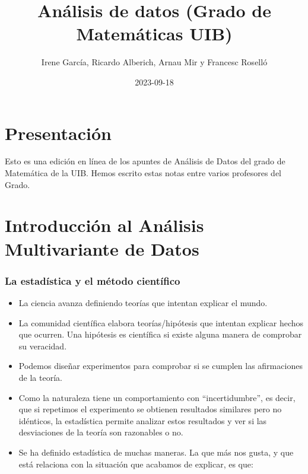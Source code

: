\documentclass[
  letterpaper,
  DIV=11,
  numbers=noendperiod]{scrreprt}
\title{Análisis de datos (Grado de Matemáticas UIB)}
\author{Irene García, Ricardo Alberich, Arnau Mir y Francesc Roselló}
\date{2023-09-18}
\renewcommand*\contentsname{Tabla de contenidos}
\newcommand\contentsname{Tabla de contenidos}
\begin{document}
\maketitle
\ifdefined\Shaded\renewenvironment{Shaded}{\begin{tcolorbox}[enhanced, boxrule=0pt, breakable, sharp corners, frame hidden, borderline west={3pt}{0pt}{shadecolor}, interior hidden]}{\end{tcolorbox}}\fi

\renewcommand*\contentsname{Tabla de contenidos}
{
\hypersetup{linkcolor=}
\setcounter{tocdepth}{2}
\tableofcontents
}

\hypertarget{presentaciuxf3n}{%
\chapter*{Presentación}\label{presentaciuxf3n}}


Esto es una edición en línea de los apuntes de Análisis de Datos del
grado de Matemática de la UIB. Hemos escrito estas notas entre varios
profesores del Grado.


\hypertarget{introducciuxf3n-al-anuxe1lisis-multivariante-de-datos}{%
\chapter{Introducción al Análisis Multivariante de
Datos}\label{introducciuxf3n-al-anuxe1lisis-multivariante-de-datos}}

\hypertarget{la-estaduxedstica-y-el-muxe9todo-cientuxedfico}{%
\subsection{La estadística y el método
científico}\label{la-estaduxedstica-y-el-muxe9todo-cientuxedfico}}

\begin{itemize}
\item
  La ciencia avanza definiendo teorías que intentan explicar el mundo.
\item
  La comunidad científica elabora teorías/hipótesis que intentan
  explicar hechos que ocurren. Una hipótesis es científica si existe
  alguna manera de comprobar su veracidad.
\item
  Podemos diseñar experimentos para comprobar si se cumplen las
  afirmaciones de la teoría.
\item
  Como la naturaleza tiene un comportamiento con ``incertidumbre'', es
  decir, que si repetimos el experimento se obtienen resultados
  similares pero no idénticos, la estadística permite analizar estos
  resultados y ver si las desviaciones de la teoría son razonables o no.
\item
  Se ha definido estadística de muchas maneras. La que más nos gusta, y
  que está relaciona con la situación que acabamos de explicar, es que:
\end{itemize}
\end{document}
